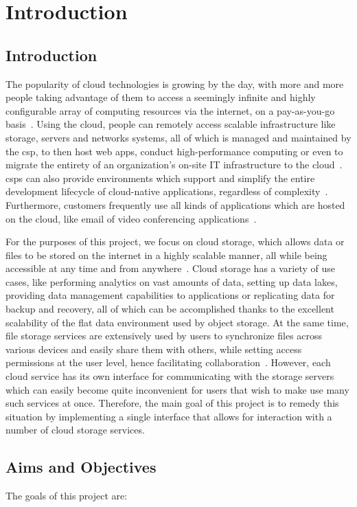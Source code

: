 \chapter{Introduction}

\section{Introduction}
The popularity of cloud technologies is growing by the day, with more and more people taking advantage of them to access a seemingly infinite and highly configurable array of computing resources via the internet, on a pay-as-you-go basis~\cite{gvr}. Using the cloud, people can remotely access scalable infrastructure like storage, servers and networks systems, all of which is managed and maintained by the \ac{csp}, to then host web apps, conduct high-performance computing or even to migrate the entirety of an organization's on-site IT infrastructure to the cloud~\cite{iaas}. \acp{csp} can also provide environments which support and simplify the entire development lifecycle of cloud-native applications, regardless of complexity~\cite{paas}. Furthermore, customers frequently use all kinds of applications which are hosted on the cloud, like email of video conferencing applications~\cite{saas}.

For the purposes of this project, we focus on cloud storage, which allows data or files to be stored on the internet in a highly scalable manner, all while being accessible at any time and from anywhere~\cite{s3_cloud_storage}. Cloud storage has a variety of use cases, like performing analytics on vast amounts of data, setting up data lakes, providing data management capabilities to applications or replicating data for backup and recovery, all of which can be accomplished thanks to the excellent scalability of the flat data environment used by object storage. At the same time, file storage services are extensively used by users to synchronize files across various devices and easily share them with others, while setting access permissions at the user level, hence facilitating collaboration~\cite{objectvsfile,objectvsfile2}. However, each cloud service has its own interface for communicating with the storage servers which can easily become quite inconvenient for users that wish to make use many such services at once. Therefore, the main goal of this project is to remedy this situation by implementing a single interface that allows for interaction with a number of cloud storage services.

\section{Aims and Objectives}
The goals of this project are:

